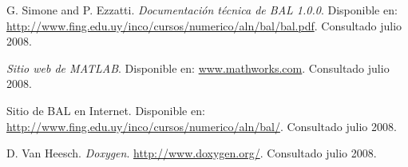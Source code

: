 \documentclass{cacic06}
\begin{document}
\begin{thebibliography}{99}
 G. Simone and P. Ezzatti. \textit{Documentación técnica de BAL 1.0.0}.
Disponible en: \url{http://www.fing.edu.uy/inco/cursos/numerico/aln/bal/bal.pdf}. Consultado julio 2008.

 \textit{Sitio web de MATLAB}.
Disponible en: \url{www.mathworks.com}. Consultado julio 2008.

 Sitio de BAL en Internet.
Disponible en: \url{http://www.fing.edu.uy/inco/cursos/numerico/aln/bal/}. Consultado julio 2008.

 D. Van Heesch. \textit{Doxygen}. \url{http://www.doxygen.org/}. Consultado julio 2008.
\end{thebibliography}
\end{document}
